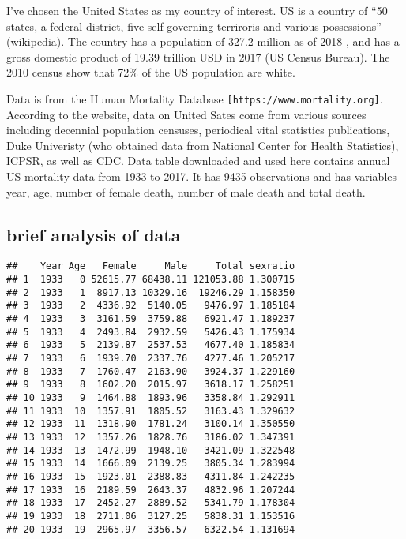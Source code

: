 \documentclass[]{article}
\newenvironment{Shaded}{\begin{snugshade}}{\end{snugshade}}
\newcommand{\DataTypeTok}[1]{\textcolor[rgb]{0.13,0.29,0.53}{#1}}
\newcommand{\DecValTok}[1]{\textcolor[rgb]{0.00,0.00,0.81}{#1}}
\newcommand{\KeywordTok}[1]{\textcolor[rgb]{0.13,0.29,0.53}{\textbf{#1}}}
\newcommand{\NormalTok}[1]{#1}
\newcommand{\OperatorTok}[1]{\textcolor[rgb]{0.81,0.36,0.00}{\textbf{#1}}}
\newcommand{\StringTok}[1]{\textcolor[rgb]{0.31,0.60,0.02}{#1}}
\begin{document}
I've chosen the United States as my country of interest. US is a country
of ``50 states, a federal district, five self-governing terriroris and
various possessions'' (wikipedia). The country has a population of 327.2
million as of 2018 , and has a gross domestic product of 19.39 trillion
USD in 2017 (US Census Bureau). The 2010 census show that 72\% of the US
population are white.

Data is from the Human Mortality Database
\texttt{{[}https://www.mortality.org{]}}. According to the website, data
on United Sates come from various sources including decennial population
censuses, periodical vital statistics publications, Duke Univeristy (who
obtained data from National Center for Health Statistics), ICPSR, as
well as CDC. Data table downloaded and used here contains annual US
mortality data from 1933 to 2017. It has 9435 observations and has
variables year, age, number of female death, number of male death and
total death.

\hypertarget{brief-analysis-of-data}{%
\subsection{brief analysis of data}\label{brief-analysis-of-data}}

\begin{Shaded}
\end{Shaded}

\begin{verbatim}
##    Year Age   Female     Male     Total sexratio
## 1  1933   0 52615.77 68438.11 121053.88 1.300715
## 2  1933   1  8917.13 10329.16  19246.29 1.158350
## 3  1933   2  4336.92  5140.05   9476.97 1.185184
## 4  1933   3  3161.59  3759.88   6921.47 1.189237
## 5  1933   4  2493.84  2932.59   5426.43 1.175934
## 6  1933   5  2139.87  2537.53   4677.40 1.185834
## 7  1933   6  1939.70  2337.76   4277.46 1.205217
## 8  1933   7  1760.47  2163.90   3924.37 1.229160
## 9  1933   8  1602.20  2015.97   3618.17 1.258251
## 10 1933   9  1464.88  1893.96   3358.84 1.292911
## 11 1933  10  1357.91  1805.52   3163.43 1.329632
## 12 1933  11  1318.90  1781.24   3100.14 1.350550
## 13 1933  12  1357.26  1828.76   3186.02 1.347391
## 14 1933  13  1472.99  1948.10   3421.09 1.322548
## 15 1933  14  1666.09  2139.25   3805.34 1.283994
## 16 1933  15  1923.01  2388.83   4311.84 1.242235
## 17 1933  16  2189.59  2643.37   4832.96 1.207244
## 18 1933  17  2452.27  2889.52   5341.79 1.178304
## 19 1933  18  2711.06  3127.25   5838.31 1.153516
## 20 1933  19  2965.97  3356.57   6322.54 1.131694
\end{verbatim}
\end{document}
